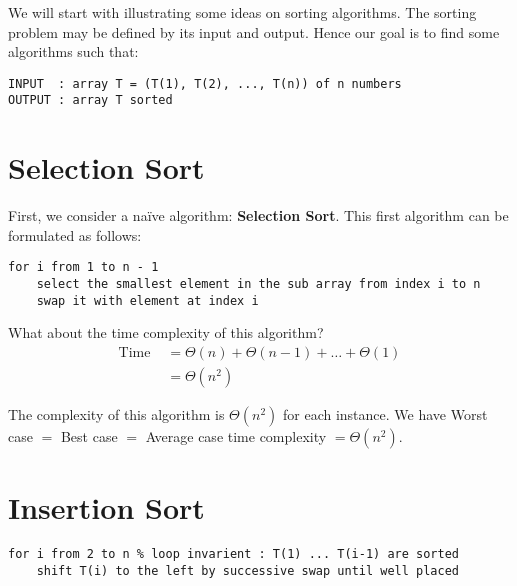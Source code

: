 We will start with illustrating some ideas on sorting algorithms. The sorting problem may be defined by its input and output. Hence our goal is to find some algorithms such that: 


\begin{lstlisting}[label={list:c1:inout},caption=Inputs and outputs of sorting algorithms]
INPUT  : array T = (T(1), T(2), ..., T(n)) of n numbers
OUTPUT : array T sorted
\end{lstlisting}


\section{Selection Sort}

First, we consider a naïve algorithm: \textbf{Selection Sort}. This first algorithm can be formulated as follows:

\begin{lstlisting}[label={list:c1:selection},caption=Pseudo-code of the selection sort algorithm]
for i from 1 to n - 1
    select the smallest element in the sub array from index i to n
    swap it with element at index i
\end{lstlisting}


What about the time complexity of this algorithm?
\begin{align*}
\text{Time } &= \Theta(n) + \Theta(n-1) + \ldots + \Theta(1) \\
& = \Theta(n^2)
\end{align*}

\begin{remark}
The complexity of this algorithm is $\Theta(n^2)$ for each instance. We have Worst case $=$ Best case $=$ Average case time complexity $= \Theta(n^2)$.
\end{remark}

\section{Insertion Sort}

\begin{lstlisting}[label={list:c1:insertion},caption=Pseudo-code of the insertion sort algorithm]
for i from 2 to n % loop invarient : T(1) ... T(i-1) are sorted
    shift T(i) to the left by successive swap until well placed
\end{lstlisting}

